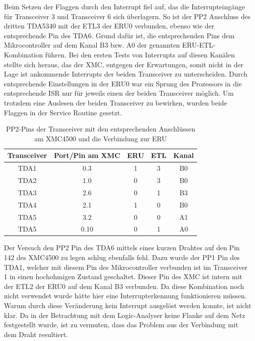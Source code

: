 Beim Setzen der Flaggen durch den Interrupt fiel auf, das die Interrupteingänge für Transceiver 3 und Transceiver 6 sich überlagern. So ist der PP2 Anschluss des dritten TDA5340 mit der \ac{ETL}3 der \ac{ERU}0 verbunden, ebenso wie der entsprechende Pin des TDA6. Grund dafür ist, die entsprechenden Pins dem Mikrocontroller auf dem Kanal B3 bzw. A0 der genannten \ac{ERU}-\ac{ETL}-Kombination führen. Bei den ersten Tests von Interrupts auf diesen Kanälen stellte sich heraus, das der XMC, entgegen der Erwartungen, somit nicht in der Lage ist ankommende Interrupts der beiden Transceiver zu unterscheiden. Durch entsprechende Einstellungen in der \ac{ERU}0 war ein Sprung des Prozessors in die entsprechende \acl{ISR} nur für jeweils einen der beiden Transceiver möglich. Um trotzdem eine Auslesen der beiden Transceiver zu bewirken, wurden beide Flaggen in der Service Routine gesetzt.
\begin{table}[h]
	\centering
\begin{tabular}{ccccc}
	Transceiver & Port/Pin am XMC & ERU & ETL & Kanal \\ 
	\hline
	TDA1 & 0.3 & 1 & 3 & B0 \\ 
	TDA2 & 1.0 & 0 & 3 & B0 \\ 
	TDA3 & 2.6 & 0 & 1 & B3 \\ 
	TDA4 & 2.1 & 1 & 0 & B0 \\ 
	TDA5 & 3.2 & 0 & 0 & A1 \\ 
	TDA5 & 0.10 & 0 & 1 & A0 \\ 
\end{tabular} 
\caption{PP2-Pins der Transceiver mit den entsprechenden Anschlüssen am XMC4500 und die Verbindung zur ERU}
\label{tab:PP2ERU}
\end{table}
Der Versuch den PP2 Pin des TDA6 mittels eines kurzen Drahtes auf den Pin 142 des XMC4500 zu legen schlug ebenfalls fehl. Dazu wurde der PP1 Pin des TDA1, welcher mit diesem Pin des Mikrocontroller verbunden ist im Transceiver 1 in einen hochohmigen Zustand geschaltet. Dieser Pin des XMC ist intern mit der \ac{ETL}2 der \ac{ERU}0 auf dem Kanal B3 verbunden. Da diese Kombination noch nicht verwendet wurde hätte hier eine Interrupterkennung funktionieren müssen. Warum durch diese Veränderung kein Interrupt ausgelöst werden konnte, ist nicht klar. Da in der Betrachtung mit dem Logic-Analyser keine Flanke auf dem Netz festgestellt wurde, ist zu vermuten, dass das Problem aus der Verbindung mit dem Draht resultiert.



